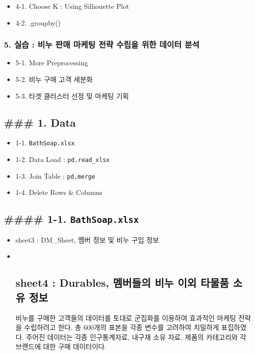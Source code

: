 \documentclass[11pt]{article}
\providecommand{\tightlist}{%
      \setlength{\itemsep}{0pt}\setlength{\parskip}{0pt}}
\begin{document}
\begin{itemize}
\tightlist
\item
  4-1. Choose K : Using Silhouette Plot
\item
  4-2. .groupby()
\end{itemize}

\subsubsection{5. 실습 : 비누 판매 마케팅 전략 수립을 위한 데이터
분석}\label{uxc2e4uxc2b5-uxbe44uxb204-uxd310uxb9e4-uxb9c8uxcf00uxd305-uxc804uxb7b5-uxc218uxb9bduxc744-uxc704uxd55c-uxb370uxc774uxd130-uxbd84uxc11d}

\begin{itemize}
\tightlist
\item
  5-1. More Preprocessing
\item
  5-2. 비누 구매 고객 세분화
\item
  5-3. 타겟 클러스터 선정 및 마케팅 기획
\end{itemize}

    \subsection{\#\#\# 1. Data}\label{data}

\begin{itemize}
\tightlist
\item
  1-1. \texttt{BathSoap.xlsx}
\item
  1-2. Data Load : \texttt{pd.read\_xlsx}
\item
  1-3. Join Table : \texttt{pd.merge}
\item
  1-4. Delete Rows \& Columns
\end{itemize}

    \subsection{\texorpdfstring{\#\#\#\# 1-1.
\texttt{BathSoap.xlsx}}{\#\#\#\# 1-1. BathSoap.xlsx}}\label{bathsoap.xlsx}

\begin{itemize}
\item
  sheet3 : DM\_Sheet, 멤버 정보 및 비누 구입 정보
\item ~
  \subsection{sheet4 : Durables, 멤버들의 비누 이외 타물품 소유
  정보}\label{sheet4-durables-uxba64uxbc84uxb4e4uxc758-uxbe44uxb204-uxc774uxc678-uxd0c0uxbb3cuxd488-uxc18cuxc720-uxc815uxbcf4}

  비누를 구매한 고객들의 데이터를 토대로 군집화를 이용하여 효과적인
  마케팅 전략을 수립하려고 한다. 총 600개의 표본을 각종 변수를 고려하여
  치밀하게 표집하였다. 주어진 데이터는 각종 인구통계자료, 내구재 소유
  자료, 제품의 카테고리와 각 브랜드에 대한 구매 데이터이다.
\end{itemize}
\end{document}
